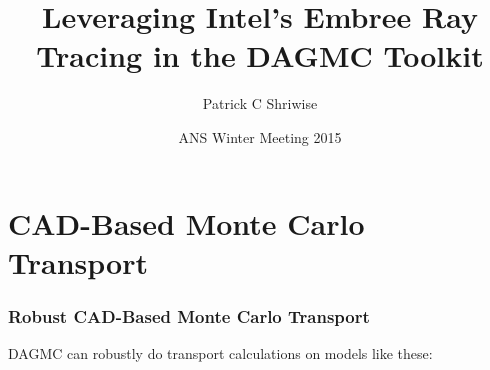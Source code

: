 \documentclass[12pt]{beamer}
\title{Leveraging Intel's Embree Ray Tracing in the DAGMC Toolkit}
\author{Patrick C Shriwise}
\institute{University of Wisconsin - Madison}
\date{ANS Winter Meeting 2015}
\begin{document}
\frame{\titlepage \addtocounter{framenumber}{-1}}


\begin{frame}
\frametitle{\null}
\tableofcontents
\end{frame}

\section{CAD-Based Monte Carlo Transport} %
\begin{frame}

\frametitle{Robust CAD-Based Monte Carlo Transport}

DAGMC can robustly do transport calculations on models like these:


\begin{center}
\begin{tabular}{c c}


\end{tabular}
\end{center}
\end{frame}
\end{document}
